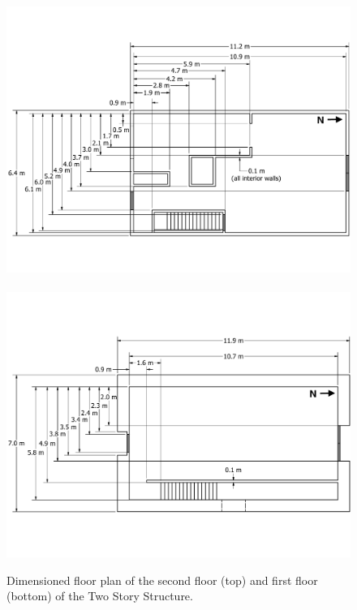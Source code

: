 \documentclass[12pt,oneside]{book}
\begin{document}
\clearpage

\begin{figure}[!ht]
	\includegraphics[width=\columnwidth]{../Figures/Floor_Plans/West_Structure_2nd_Floor_Dimensioned_Full}
	\\~\\
	\includegraphics[width=\columnwidth]{../Figures/Floor_Plans/West_Structure_1st_Floor_Dimensioned_Full}
	\caption[Dimensioned floor plan of the first and second floors of the Two Story Structure.]{Dimensioned floor plan of the second floor (top) and first floor (bottom) of the Two Story Structure.}
	\label{fig:west_dimensioned_plan}
\end{figure}
\end{document}
